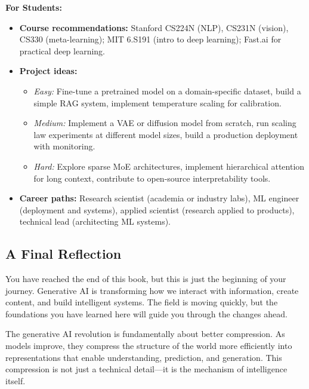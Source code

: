 \vspace{0.5em}

\textbf{For Students:}

\begin{itemize}
\item \textbf{Course recommendations:} Stanford CS224N (NLP), CS231N (vision), CS330 (meta-learning); MIT 6.S191 (intro to deep learning); Fast.ai for practical deep learning.
\item \textbf{Project ideas:}
  \begin{itemize}
  \item \textit{Easy:} Fine-tune a pretrained model on a domain-specific dataset, build a simple RAG system, implement temperature scaling for calibration.
  \item \textit{Medium:} Implement a VAE or diffusion model from scratch, run scaling law experiments at different model sizes, build a production deployment with monitoring.
  \item \textit{Hard:} Explore sparse MoE architectures, implement hierarchical attention for long context, contribute to open-source interpretability tools.
  \end{itemize}
\item \textbf{Career paths:} Research scientist (academia or industry labs), ML engineer (deployment and systems), applied scientist (research applied to products), technical lead (architecting ML systems).
\end{itemize}

\vspace{1em}

\subsection{A Final Reflection}

You have reached the end of this book, but this is just the beginning of your journey. Generative AI is transforming how we interact with information, create content, and build intelligent systems. The field is moving quickly, but the foundations you have learned here will guide you through the changes ahead.

The generative AI revolution is fundamentally about better compression. As models improve, they compress the structure of the world more efficiently into representations that enable understanding, prediction, and generation. This compression is not just a technical detail---it is the mechanism of intelligence itself.

